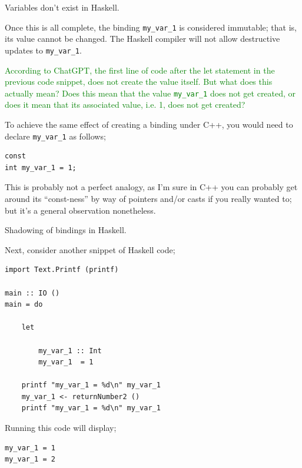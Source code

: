 \begin{frame}[t, fragile]{Variables don't exist in Haskell.}

Once this is all complete, the binding \texttt{my_var_1} is considered immutable; that is, its value cannot be changed. The Haskell
compiler will not allow destructive updates to \texttt{my_var_1}.

\textcolor{green}{According to ChatGPT, the first line of code after the let statement in the previous code snippet,
does not create the value itself. But what does this actually mean? Does this mean that the value \texttt{my_var_1}
does not get created, or does it mean that its associated value, i.e. 1, does not get created?}

To achieve the same effect of creating a binding under C++, you would need to declare \texttt{my_var_1} as follows;

\begin{verbatim}
const
int my_var_1 = 1;
\end{verbatim}

This is probably not a perfect analogy, as I'm sure in C++ you can probably get around its ``const-ness'' by way of
pointers and/or casts if you really wanted to; but it's a general observation nonetheless.

\end{frame}


\begin{frame}[t, fragile]{Shadowing of bindings in Haskell.}

Next, consider another snippet of Haskell code;

\begin{verbatim}
import Text.Printf (printf)

main :: IO ()
main = do

    let

        my_var_1 :: Int
        my_var_1  = 1

    printf "my_var_1 = %d\n" my_var_1
    my_var_1 <- returnNumber2 ()
    printf "my_var_1 = %d\n" my_var_1
\end{verbatim}

Running this code will display;

\begin{verbatim}
my_var_1 = 1
my_var_1 = 2
\end{verbatim}

\end{frame}


